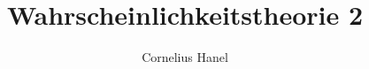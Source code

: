 \documentclass[11pt]{report}
\title{Wahrscheinlichkeitstheorie 2}
\author{Cornelius Hanel}
\date{\parbox{\linewidth}{\centering%
  Last updated: \today\endgraf\bigskip\bigskip\bigskip
Studentische Mitschrift aus dem Sommersemester 2024. Fehler oder Erg\"anzungen gerne an \texttt{corneliush99@univie.ac.at}.
\endgraf
}}
\begin{document}
\maketitle

\tableofcontents


\newcommand{\E}{\mathbb{E}}
\newcommand{\cR}{\mathcal{R}}
\newcommand{\cB}{\mathcal{B}}
\newcommand{\C}{\mathbb{C}}
\newcommand{\del}{\partial}
\newcommand{\A}{\mathcal{A}}
\newcommand{\G}{\mathcal{G}}
\renewcommand{\geq}{\geqslant}
\renewcommand{\leq}{\leqslant}
\newcommand{\eps}{\varepsilon}
\newcommand{\Pp}{\mathbb{P}}
\newcommand{\R}{\mathbb{R}}
\newcommand{\Var}{\operatorname{Var}}
\newcommand{\pspace}{(\Omega, \mathcal{A}, \Pp)}
\newcommand{\borel}{\mathcal{B}(\R)}
\newcommand{\ind}[1]{\mathds{1}_{#1}}
\newcommand{\nto}[2]{\xrightarrow[#2]{\makebox[1.5em][c]{$\scriptstyle#1$}}}‌
\newcommand{\krestr}[1]{%
  \sbox{0}{\raisebox{\dimexpr\fontcharht\font`A-\height\relax}{$\big|$}}%
  \usebox{0}%
  \raisebox{\dimexpr-\dp0+\depth\relax}{$\scriptstyle#1$}%
}







     
     
\end{document}
